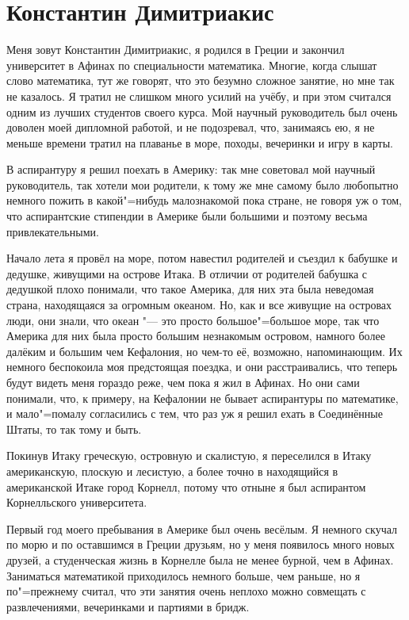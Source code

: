 \section{Константин Димитриакис}

Меня зовут Константин Димитриакис, я родился в Греции и закончил университет в
Афинах по специальности математика.
Многие, когда слышат слово математика, тут же говорят, что это безумно сложное
занятие, но мне так не казалось.
Я тратил не слишком много усилий на учёбу, и при этом считался одним из лучших
студентов своего курса.
Мой научный руководитель был очень доволен моей дипломной работой, и не
подозревал, что, занимаясь ею, я не меньше времени тратил на плаванье в море,
походы, вечеринки и игру в карты.

В аспирантуру я решил поехать в Америку: так мне советовал мой научный
руководитель, так хотели мои родители, к тому же мне самому было любопытно
немного пожить в какой"=нибудь малознакомой пока стране, не говоря уж о том, что
аспирантские стипендии в Америке были большими и поэтому весьма привлекательными.

Начало лета я провёл на море, потом навестил родителей и съездил к бабушке и
дедушке, живущими на острове Итака.
В отличии от родителей бабушка с дедушкой плохо понимали, что такое Америка, для
них эта была неведомая страна, находящаяся за огромным океаном.
Но, как и все живущие на островах люди, они знали, что океан "--- это просто
большое"=большое море, так что Америка для них была просто большим незнакомым
островом, намного более далёким и большим чем Кефалония, но чем-то её, возможно,
напоминающим.
Их немного беспокоила моя предстоящая поездка, и они расстраивались, что теперь
будут видеть меня гораздо реже, чем пока я жил в Афинах. Но они сами понимали,
что, к примеру, на Кефалонии не бывает аспирантуры по математике, и мало"=помалу
согласились с тем, что раз уж я решил ехать в Соединённые Штаты, то так тому и
быть.

Покинув Итаку греческую, островную и скалистую, я переселился в Итаку
американскую, плоскую и лесистую, а более точно в находящийся в американской
Итаке город Корнелл, потому что отныне я был аспирантом Корнелльского
университета.

Первый год моего пребывания в Америке был очень весёлым.
Я немного скучал по морю и по оставшимся в Греции друзьям, но у меня появилось
много новых друзей, а студенческая жизнь в Корнелле была не менее бурной, чем в
Афинах.
Заниматься математикой приходилось немного больше, чем раньше, но я по"=прежнему
считал, что эти занятия очень неплохо можно совмещать с развлечениями,
вечеринками и партиями в бридж.

